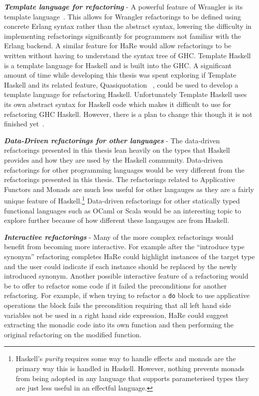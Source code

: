 \textit{\textbf{Template language for refactoring}} - A powerful feature of Wrangler is its template language~\citep{letsUser}. This allows for Wrangler refactorings to be defined using concrete Erlang syntax rather than the abstract syntax, lowering the difficulty in implementing refactorings significantly for programmers not familiar with the Erlang backend. A similar feature for HaRe would allow refactorings to be written without having to understand the syntax tree of GHC. Template Haskell is a template language for Haskell and is built into the GHC. A significant amount of time while developing this thesis was spent exploring if Template Haskell and its related feature, Quasiquotation ~\citep{quasi}, could be used to develop a template language for refactoring Haskell. Unfortunately Template Haskell uses its own abstract syntax for Haskell code which makes it difficult to use for refactoring GHC Haskell. However, there is a plan to change this though it is not finished yet~\citep{ghcTreesGrow}.

\textit{\textbf{Data-Driven refactorings for other languages}} - The data-driven refactorings presented in this thesis lean heavily on the types that Haskell provides and how they are used by the Haskell community. Data-driven refactorings for other programming languages would be very different from the refactorings presented in this thesis. The refactorings related to Applicative Functors and Monads are much less useful for other langauges as they are a fairly unique feature of Haskell.\footnote{Haskell's \textit{purity} requires some way to handle effects and monads are the primary way this is handled in Haskell. However, nothing prevents monads from being adopted in any language that supports parameterised types they are just less useful in an effectful language.} Data-driven refactorings for other statically typed functional languages such as OCaml or Scala would be an interesting topic to explore further because of how different these langauges are from Haskell.

\textit{\textbf{Interactive refactorings}} - Many of the more complex refactorings would benefit from becoming more interactive. For example after the ``introduce type synonym'' refactoring completes HaRe could highlight instances of the target type and the user could indicate if each instance should be replaced by the newly introduced synonym. Another possible interactive feature of a refactoring would be to offer to refactor some code if it failed the preconditions for another refactoring. For example, if when trying to refactor a \texttt{do} block to use applicative operations the block fails the precondition requiring that all left hand side variables not be used in a right hand side expression, HaRe could suggest extracting the monadic code into its own function and then performing the original refactoring on the modified function.

